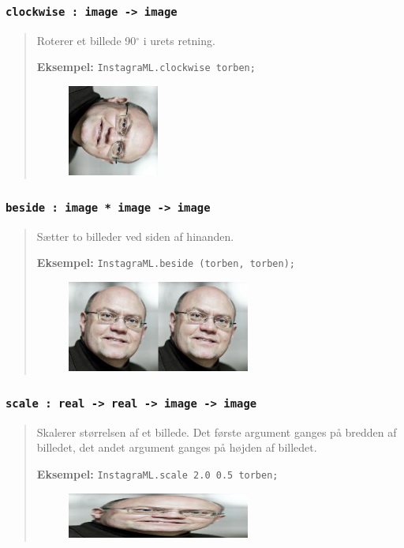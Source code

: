 \documentclass[a4paper,12pt]{article}
\begin{document}
\subsubsection*{\texttt{clockwise : image -> image}}
\begin{quotation}
\noindent
Roterer et billede 90$^\circ$ i urets retning.

\vspace{1em}
\noindent
\textbf{Eksempel:} \lstinline{InstagraML.clockwise torben;}
\begin{figure}[h!]
  \centering
  \includegraphics[width=3cm]{uge3_torbenPaaSiden.png}
\end{figure}
\end{quotation}

\subsubsection*{\texttt{beside : image * image -> image}}
\begin{quotation}
\noindent
Sætter to billeder ved siden af hinanden.

\vspace{1em}
\noindent
\textbf{Eksempel:} \lstinline{InstagraML.beside (torben, torben);}
\begin{figure}[h!]
  \centering
  \includegraphics[width=6cm]{uge3_torbenBesideTorben.png}
\end{figure}
\end{quotation}

\subsubsection*{\texttt{scale : real -> real -> image -> image}}
\begin{quotation}
\noindent
Skalerer størrelsen af et billede. Det første argument ganges på
bredden af billedet, det andet argument ganges på højden af billedet.

\vspace{1em}
\noindent
\textbf{Eksempel:} \lstinline{InstagraML.scale 2.0 0.5 torben;}
\begin{figure}[h!]
  \centering
  \includegraphics[width=6cm]{uge3_scaleTorben.png}
\end{figure}
\end{quotation}
\end{document}
